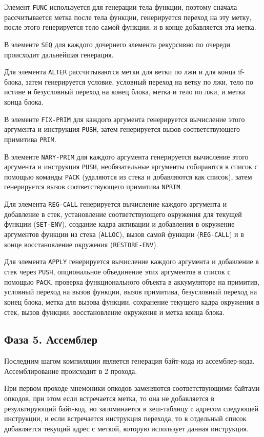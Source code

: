 Элемент \texttt{FUNC} используется для генерации тела функции, поэтому сначала рассчитывается метка после тела функции, генерируется переход на эту метку, после этого генерируется тело самой функции, и в конце добавляется эта метка.

В элементе \texttt{SEQ} для каждого дочернего элемента рекурсивно по очереди происходит дальнейшая генерация.

Для элемента \texttt{ALTER} рассчитываются метки для ветки по лжи и для конца if-блока, затем генерируется условие, условный переход на ветку по лжи, тело по истине и безусловный переход на конец блока, метка и тело по лжи, и метка конца блока.

В элементе \texttt{FIX-PRIM} для каждого аргумента генерируется вычисление этого аргумента и инструкция \texttt{PUSH}, затем генерируется вызов соответствующего примитива \texttt{PRIM}.

В элементе \texttt{NARY-PRIM} для каждого аргумента генерируется вычисление этого аргумента и инструкция \texttt{PUSH}, необязательные аргументы собираются в список с помощью команды \texttt{PACK} (удаляются из стека и добавляются как список), затем генерируется вызов соответствующего примитива \texttt{NPRIM}.

Для элемента \texttt{REG-CALL} генерируется вычисление каждого аргумента и добавление в стек, установление соответствующего окружения для текущей функции (\texttt{SET-ENV}), создание кадра активации и добавления в окружение аргументов функции из стека (\texttt{ALLOC}), вызов самой функции (\texttt{REG-CALL}) и в конце восстановление окружения (\texttt{RESTORE-ENV}).

Для элемента \texttt{APPLY} генерируется вычисление каждого аргумента и добавление в стек через \texttt{PUSH}, опциональное объединение этих аргументов в список с помощью \texttt{PACK}, проверка функционального объекта в аккумуляторе на примитив, условный переход на вызов функции, вызов примитива, безусловный переход на конец блока, метка для вызова функции, сохранение текущего кадра окружения в стек, вызов функции, восстановление окружения и метка конца блока.


\subsection{Фаза 5. Ассемблер}

Последним шагом компиляции является генерация байт-кода из ассемблер-кода. Ассемблирование происходит в 2 прохода.

При первом проходе мнемоники опкодов заменяются соответствующими байтами опкодов, при этом если встречается метка, то она не добавляется в результирующий байт-код, но запоминается в хеш-таблицу c адресом следующей инструкции, и если встречается инструкция перехода, то в отдельный список добавляется текущий адрес с меткой, которую использует данная инструкция.

